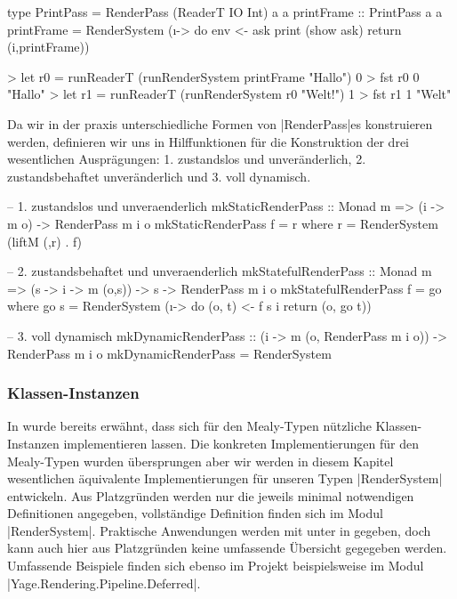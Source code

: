 \begin{haskell}[label={lst:rendersystem-beispiel-reader},caption={Beispiel Rendersystem mit ReaderT IO als Basismonade}]
type PrintPass = RenderPass (ReaderT IO Int) a a
printFrame :: PrintPass a a
printFrame = RenderSystem (\i -> do
	env <- ask 
	print (show ask)
	return (i,printFrame))
\end{haskell}

\begin{haskell}[label={lst:rendersystem-ausfuehrung-beispiel},caption={Ausführungsbeispiel Rendersystem}]
> let r0 = runReaderT (runRenderSystem printFrame "Hallo") 0
> fst r0
0
"Hallo"
> let r1 = runReaderT (runRenderSystem r0 "Welt!") 1
> fst r1
1
"Welt"
\end{haskell}

Da wir in der praxis unterschiedliche Formen von |RenderPass|es konstruieren werden, definieren wir uns in  Hilffunktionen für die Konstruktion der drei wesentlichen Ausprägungen: 1. zustandslos und unveränderlich, 2. zustandsbehaftet unveränderlich und 3. voll dynamisch.

\begin{haskell}[label={lst:renderpass-ctr},caption={Konstruktoren für einen RenderPass}]
-- 1. zustandslos und unveraenderlich
mkStaticRenderPass :: Monad m => (i -> m o) -> RenderPass m i o
mkStaticRenderPass f = r where r = RenderSystem (liftM (,r) . f)

-- 2. zustandsbehaftet und unveraenderlich
mkStatefulRenderPass :: Monad m => (s -> i -> m (o,s)) -> s -> RenderPass m i o
mkStatefulRenderPass f = go where
  go s = RenderSystem (\i -> do
    (o, t) <- f s i
    return (o, go t))

-- 3. voll dynamisch
mkDynamicRenderPass :: (i -> m (o, RenderPass m i o)) -> RenderPass m i o
mkDynamicRenderPass = RenderSystem
\end{haskell}



\subsubsection{Klassen-Instanzen}
\label{sec:rendersystem-klassen-instanzen}

In  wurde bereits erwähnt, dass sich für den Mealy-Typen nützliche Klassen-Instanzen implementieren lassen. Die konkreten Implementierungen für den Mealy-Typen wurden übersprungen aber wir werden in diesem Kapitel wesentlichen äquivalente Implementierungen für unseren Typen |RenderSystem| entwickeln. Aus Platzgründen werden nur die jeweils minimal notwendigen Definitionen angegeben, vollständige Definition finden sich im Modul |RenderSystem|. Praktische Anwendungen werden mit unter in  gegeben, doch kann auch hier aus Platzgründen keine umfassende Übersicht gegegeben werden. Umfassende Beispiele finden sich ebenso im Projekt beispielsweise im Modul |Yage.Rendering.Pipeline.Deferred|.


